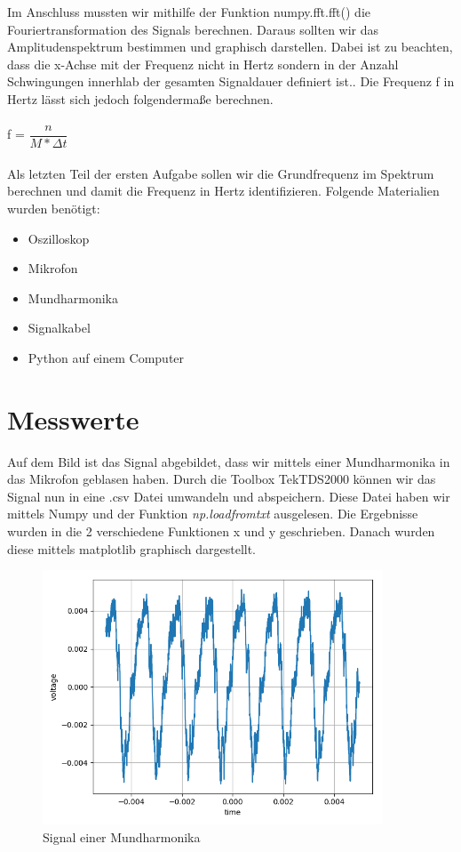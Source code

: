 \documentclass[12pt, oneside, a4paper, \docLanguage]{report}
\begin{document}
\newpage
Im Anschluss mussten wir mithilfe der Funktion numpy.fft.fft() die Fouriertransformation des Signals berechnen. Daraus sollten wir das Amplitudenspektrum bestimmen und graphisch darstellen.
Dabei ist zu beachten, dass die x-Achse mit der Frequenz nicht in Hertz sondern in der Anzahl Schwingungen innerhlab der gesamten Signaldauer definiert ist..
Die Frequenz f in Hertz lässt sich jedoch folgendermaße berechnen.
\\~\\
f = $\dfrac{n}{M * \Delta t}$
\\~\\
Als letzten Teil der ersten Aufgabe sollen wir die Grundfrequenz im Spektrum berechnen und damit die Frequenz in Hertz identifizieren.
Folgende Materialien wurden benötigt: ~\par
\begin{itemize}
	\item Oszilloskop
	\item Mikrofon
	\item Mundharmonika
	\item Signalkabel
	\item Python auf einem Computer
\end{itemize}
\newpage
\section{Messwerte}
\label{chap:VERSUCH_1_MESSWERTE}
Auf dem Bild ist das Signal abgebildet, dass wir mittels einer Mundharmonika in das Mikrofon geblasen haben.
\newline
Durch die Toolbox TekTDS2000 können wir das Signal nun in eine .csv Datei umwandeln und abspeichern.
\newline
Diese Datei haben wir mittels Numpy und der Funktion \textit{np.loadfromtxt} ausgelesen.
Die Ergebnisse wurden in die 2 verschiedene Funktionen x und y geschrieben.
\newline
Danach wurden diese mittels matplotlib graphisch dargestellt.
\begin{figure}[H]
	\centering\small
	\includegraphics[width=0.9\textwidth]{../data/img/mundharmonika.png}
	\caption{Signal einer Mundharmonika}
	\label{img:Signal einer Mundharmonika}
\end{figure}
\newpage
\end{document}
